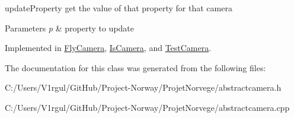 update\-Property get the value of that property for that camera 


\begin{DoxyParams}{Parameters}
{\em p} & property to update \\
\hline
\end{DoxyParams}


Implemented in \hyperlink{class_fly_camera_a8f87a0d8ccbee558e629189e2c8ab271}{Fly\-Camera}, \hyperlink{class_is_camera_a5e2c484168c627eb79d61658e880300d}{Is\-Camera}, and \hyperlink{class_test_camera_a6b0c9e25baafe0a8d211b32851cb67b3}{Test\-Camera}.



The documentation for this class was generated from the following files\-:\begin{DoxyCompactItemize}
\item 
C\-:/\-Users/\-V1rgul/\-Git\-Hub/\-Project-\/\-Norway/\-Projet\-Norvege/abstractcamera.\-h\item 
C\-:/\-Users/\-V1rgul/\-Git\-Hub/\-Project-\/\-Norway/\-Projet\-Norvege/abstractcamera.\-cpp\end{DoxyCompactItemize}
